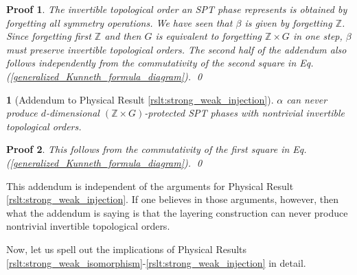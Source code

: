\documentclass[sort&compress]{elsarticle}
\theoremstyle{theoremstyle}
\theoremstyle{framedtheoremstyle}
\theoremstyle{definitionstyle}
\theoremstyle{definitionstyle}
\theoremstyle{definitionstyle}
\theoremstyle{definitionstyle}
\theoremstyle{nameddefinitionstyle}
\theoremstyle{framednameddefinitionstyle}
\newtheorem*{framednameddef}{}
\theoremstyle{proofstyle}
\newtheorem{pf}{Proof}
\theoremstyle{definitionstyle}
\newcommand{\ZZZ}{\mathbb{Z}}
\begin{document}
\begin{pf}
The invertible topological order an SPT phase represents is obtained by forgetting all symmetry operations. We have seen that $\beta$ is given by forgetting $\ZZZ$. Since forgetting first $\ZZZ$ and then $G$ is equivalent to forgetting $\ZZZ \times G$ in one step, $\beta$ must preserve invertible topological orders.
The second half of the addendum also follows independently from the commutativity of the second square in Eq.\,(\ref{generalized_Kunneth_formula_diagram}).
\qed\end{pf}

\begin{framed}\begin{framednameddef}[Addendum to Physical Result \ref{rslt:strong_weak_injection}]
$\alpha$ can never produce $d$-dimensional $(\ZZZ \times G)$-protected SPT phases with nontrivial invertible topological orders.
\end{framednameddef}\end{framed}

\begin{pf}
This follows from the commutativity of the first square in Eq.\,(\ref{generalized_Kunneth_formula_diagram}).
\qed\end{pf}

This addendum is independent of the arguments for Physical Result \ref{rslt:strong_weak_injection}. If one believes in those arguments, however, then what the addendum is saying is that the layering construction can never produce nontrivial invertible topological orders.

Now, let us spell out the implications of Physical Results \ref{rslt:strong_weak_isomorphism}-\ref{rslt:strong_weak_injection} in detail.
\end{document}
